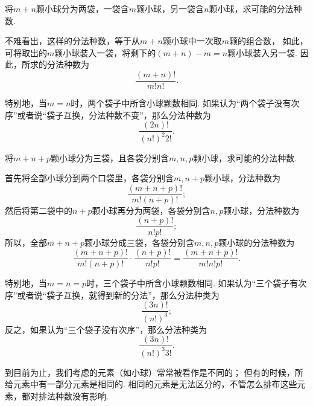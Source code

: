 \begin{example}
将\(m+n\)颗小球分为两袋，一袋含\(m\)颗小球，另一袋含\(n\)颗小球，求可能的分法种数.
\begin{solution}
不难看出，这样的分法种数，等于从\(m+n\)颗小球中一次取\(m\)颗的组合数，
如此，可将取出的\(m\)颗小球装入一袋，将剩下的\((m+n)-m=n\)颗小球装入另一袋.
因此，所求的分法种数为\begin{equation*}
	\frac{(m+n)!}{m! n!}.
\end{equation*}

特别地，当\(m=n\)时，两个袋子中所含小球颗数相同.
如果认为“两个袋子没有次序”或者说“袋子互换，分法种数不变”，那么分法种数为\begin{equation*}
	\frac{(2n)!}{(n!)^2 2!}.
\end{equation*}
\end{solution}
\end{example}

\begin{example}
将\(m+n+p\)颗小球分为三袋，且各袋分别含\(m,n,p\)颗小球，求可能的分法种数.
\begin{solution}
首先将全部小球分到两个口袋里，各袋分别含\(m,n+p\)颗小球，分法种数为\begin{equation*}
	\frac{(m+n+p)!}{m!(n+p)!};
\end{equation*}
然后将第二袋中的\(n+p\)颗小球再分为两袋，各袋分别含\(n,p\)颗小球，分法种数为\begin{equation*}
	\frac{(n+p)!}{n! p!};
\end{equation*}
所以，全部\(m+n+p\)颗小球分成三袋，各袋分别含\(m,n,p\)颗小球的分法种数为\begin{equation*}
	\frac{(m+n+p)!}{m!(n+p)!} \cdot \frac{(n+p)!}{n! p!}
	= \frac{(m+n+p)!}{m! n! p!}.
\end{equation*}

特别地，当\(m=n=p\)时，三个袋子中所含小球颗数相同.
如果认为“三个袋子有次序”或者说“袋子互换，就得到新的分法”，那么分法种类为\begin{equation*}
	\frac{(3n)!}{(n!)^3};
\end{equation*}
反之，如果认为“三个袋子没有次序”，那么分法种类为\begin{equation*}
	\frac{(3n)!}{(n!)^3 3!}.
\end{equation*}
\end{solution}
\end{example}

到目前为止，我们考虑的元素（如小球）常常被看作是不同的；
但有的时候，所给元素中有一部分元素是相同的.
相同的元素是无法区分的，不管怎么排布这些元素，都对排法种数没有影响.

